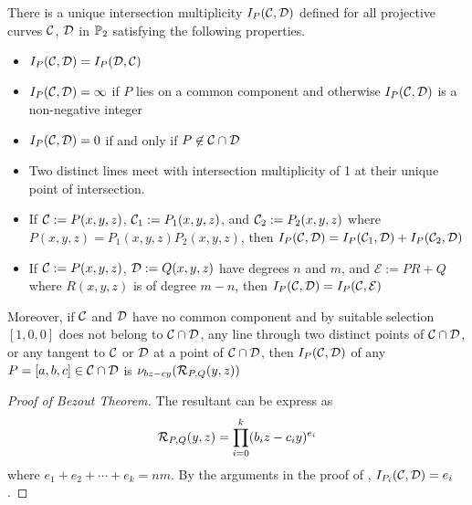 \begin{definition}
    There is a unique intersection multiplicity $I_P(\mathcal C,\mathcal D)$ defined for all projective curves $\mathcal C$, $\mathcal D$ in $\mathbb P_2$ satisfying the following properties.
    \begin{itemize}
        \item $I_P(\mathcal C,\mathcal D)=I_P(\mathcal D,\mathcal C)$
        \item $I_P(\mathcal C,\mathcal D)=\infty$ if $P$ lies on a common component and otherwise $I_P(\mathcal C,\mathcal D)$ is a non-negative integer
        \item $I_P(\mathcal C,\mathcal D)=0$ if and only if $P\not\in\mathcal C\cap\mathcal D$
        \item Two distinct lines meet with intersection multiplicity of 1 at their unique point of intersection.
        \item If $\mathcal C:=P(x,y,z)$, $\mathcal C_1:=P_1(x,y,z)$, and $\mathcal C_2:=P_2(x,y,z)$ where $P(x,y,z)=P_1(x,y,z)P_2(x,y,z)$, then $I_P(\mathcal C,\mathcal D)=I_P(\mathcal C_1,\mathcal D)+I_P(\mathcal C_2,\mathcal D)$
        \item If $\mathcal C:=P(x,y,z)$, $\mathcal D:=Q(x,y,z)$ have degrees $n$ and $m$, and $\mathcal{E}:=PR+Q$ where $R(x,y,z)$ is of degree $m-n$, then $I_P(\mathcal C,\mathcal D)=I_P(\mathcal C,\mathcal{E})$
    \end{itemize}
    Moreover, if $\mathcal C$ and $\mathcal D$ have no common component and by suitable selection $[1,0,0]$ does not belong to $\mathcal C\cap\mathcal D$, any line through two distinct points of $\mathcal C\cap\mathcal D$, or any tangent to $\mathcal C$ or $\mathcal D$ at a point of $\mathcal C\cap\mathcal D$, then $I_P(\mathcal C,\mathcal D)$ of any $P=[a,b,c]\in\mathcal C\cap\mathcal D$ is $\nu_{bz-cy}(\mathcal R_{P,Q}(y,z))$
\end{definition}

\begin{proof}[Proof of Bezout Theorem]
    The resultant can be express as
    $$\mathcal R_{P,Q}(y,z)=\prod_{i=0}^k(b_iz-c_iy)^{e_i}$$
    where $e_1+e_2+\cdots+e_k=nm$. By the arguments in the proof of , $I_{P_i}(\mathcal C,\mathcal D)=e_i$.
\end{proof}
